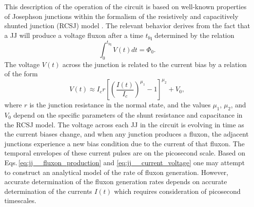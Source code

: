 \documentclass[twocolumn]{article}
\begin{document}
This description of the operation of the circuit is based on well-known properties of Josephson junctions within the formalism of the resistively and capacitively shunted junction (RCSJ) model \cite{vatu1998,ka1999,ti1996}. The relevant behavior derives from the fact that a JJ will produce a voltage fluxon after a time $t_{\mathrm{fq}}$ determined by the relation
\begin{equation}
\label{eq:jj__fluxon_production}
\int_0^{t_{\mathrm{fq}}}V(t)dt = \Phi_0.
\end{equation}
The voltage $V(t)$ across the junction is related to the current bias by a relation of the form
\begin{equation}
\label{eq:jj__current_voltage}
V(t) \approx I_c r \left[ \left( \frac{I(t)}{I_c} \right)^{\mu_1} -1 \right]^{\mu_2} + V_0,
\end{equation}
where $r$ is the junction resistance in the normal state, and the values $\mu_1$, $\mu_2$, and $V_0$ depend on the specific parameters of the shunt resistance and capacitance in the RCSJ model. The voltage across each JJ in the circuit is evolving in time as the current biases change, and when any junction produces a fluxon, the adjacent junctions experience a new bias condition due to the current of that fluxon. The temporal envelopes of these current pulses are on the picosecond scale. Based on Eqs.\,\ref{eq:jj__fluxon_production} and \ref{eq:jj__current_voltage} one may attempt to construct an analytical model of the rate of fluxon generation. However, accurate determination of the fluxon generation rates depends on accurate determination of the currents $I(t)$ which requires consideration of picosecond timescales. 
\end{document}
